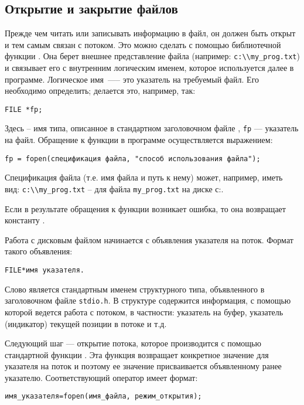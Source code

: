 \subsection{Открытие и закрытие файлов}
Прежде чем читать или записывать информацию в файл, он должен быть открыт и тем самым связан с потоком. Это можно сделать
с помощью библиотечной функции . Она берет внешнее представление файла (например: \verb|c:\\my_prog.txt|) и связывает его
с внутренним логическим именем, которое используется далее в программе. Логическое имя~---– это указатель на требуемый файл.
Его необходимо определить; делается это, например, так:
\begin{verbatim}
FILE *fp;
\end{verbatim}
Здесь  – имя типа, описанное в стандартном заголовочном файле , \verb|fp| --- указатель на файл.
Обращение к функции  в программе осуществляется выражением:
\begin{verbatim}
fp = fopen(спецификация файла, "способ использования файла");
\end{verbatim}

Спецификация файла (т.е. имя файла и путь к нему) может, например, иметь вид: \verb|c:\\my_prog.txt| – для файла \verb|my_prog.txt| на диске с:.

Если в результате обращения к функции  возникает ошибка, то она возвращает константу .

Работа с дисковым файлом начинается с объявления указателя на поток. Формат такого объявления:
\begin{verbatim}
FILE*имя указателя.
\end{verbatim}

Слово  является стандартным именем структурного типа, объявленного в заголовочном файле \verb|stdio.h|.
В структуре  содержится информация, с помощью которой ведется работа с потоком, в частности: указатель
на буфер, указатель (индикатор) текущей позиции в потоке и т.д.

Следующий шаг --- открытие потока, которое производится с помощью стандартной функции . Эта функция
возвращает конкретное значение для указателя на поток и поэтому ее значение присваивается объявленному ранее указателю.
Соответствующий оператор имеет формат:
\begin{verbatim}
имя_указателя=fopen(имя_файла, режим_открытия);
\end{verbatim}

